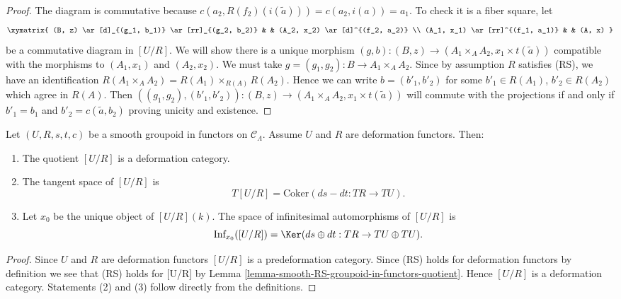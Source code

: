 \begin{proof}
\medskip\noindent
The diagram is commutative because
$c(a_2, R(f_2)(i(\widetilde{a}))) = c(a_2, i(a)) = a_1$.
To check it is a fiber square, let
$$
\xymatrix{
(B, z) \ar[d]_{(g_1, b_1)} \ar[rr]_{(g_2, b_2)} & & (A_2, x_2)
\ar[d]^{(f_2, a_2)} \\
(A_1, x_1) \ar[rr]^{(f_1, a_1)} & & (A, x)
}
$$
be a commutative diagram in $[U/R]$. We will show there is a unique morphism
$(g, b) : (B, z) \to (A_1 \times_A A_2, x_1 \times t(\widetilde{a}))$
compatible with the morphisms to $(A_1, x_1)$ and $(A_2, x_2)$.
We must take $g = (g_1, g_2) : B \to A_1 \times_A A_2$.
Since by assumption $R$ satisfies (RS), we have an identification
$R(A_1 \times_A A_2) = R(A_1) \times_{R(A)} R(A_2)$.
Hence we can write $b = (b'_1, b'_2)$ for some
$b'_1 \in R(A_1)$, $b'_2 \in R(A_2)$ which agree in $R(A)$.
Then
$((g_1, g_2), (b'_1, b'_2)) : (B, z) \to
(A_1 \times_A A_2, x_1 \times t(\widetilde{a}))$
will commute with the projections if and only if
$b'_1 = b_1$ and $b'_2 = c(\widetilde{a}, b_2)$ proving unicity and
existence.
\end{proof}

\begin{lemma}
\label{lemma-deformation-groupoid-quotient}
Let $(U, R, s, t, c)$ be a smooth groupoid in functors on $\mathcal{C}_\Lambda$.
Assume $U$ and $R$ are deformation functors. Then:
\begin{enumerate}
\item The quotient $[U/R]$ is a deformation category.
\item The tangent space of $[U/R]$ is
$$
T[U/R] = \text{Coker}(ds-dt: TR \to TU).
$$
\item Let $x_0$ be the unique object of $[U/R](k)$.  The space of infinitesimal
automorphisms of $[U/R]$ is
$$
\text{Inf}_{x_0}([U/R]) =
\Ker(ds \oplus dt : TR \to TU \oplus TU).
$$
\end{enumerate}
\end{lemma}

\begin{proof}
Since $U$ and $R$ are deformation functors $[U/R]$ is a predeformation
category. Since (RS) holds for deformation functors by
definition we see that (RS) holds for [U/R] by
Lemma \ref{lemma-smooth-RS-groupoid-in-functors-quotient}.
Hence $[U/R]$ is a deformation category. Statements (2) and (3)
follow directly from the definitions.
\end{proof}








